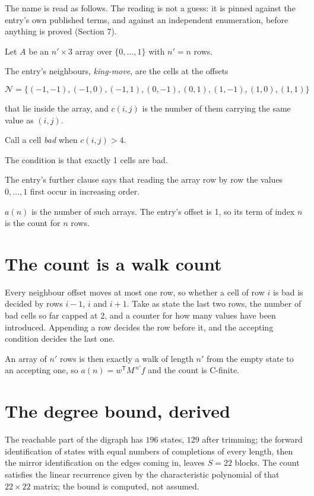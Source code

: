 \documentclass[11pt]{article}
\theoremstyle{definition}
\begin{document}
The name is read as follows. The reading is not a guess: it is pinned against the entry's own published terms, and against an independent enumeration, before anything is proved (Section 7).

Let $A$ be an $n' \times 3$ array over $\{0,\dots,1\}$ with $n' = n$ rows.

The entry's neighbours, {\itshape king-move}, are the cells at the offsets

\[\mathcal{N} = \{(-1,-1), (-1,0), (-1,1), (0,-1), (0,1), (1,-1), (1,0), (1,1)\}\]

that lie inside the array, and $c(i,j)$ is the number of them carrying the same value as $(i,j)$.

Call a cell {\itshape bad} when $c(i,j) > 4$.

The condition is that exactly 1 cells are bad.

The entry's further clause says that reading the array row by row the values $0,\dots,1$ first occur in increasing order.

$a(n)$ is the number of such arrays. The entry's offset is 1, so its term of index $n$ is the count for $n$ rows.

\section{The count is a walk count}

Every neighbour offset moves at most one row, so whether a cell of row $i$ is bad is decided by rows $i-1$, $i$ and $i+1$. Take as state the last two rows, the number of bad cells so far capped at 2, and a counter for how many values have been introduced. Appending a row decides the row before it, and the accepting condition decides the last one.

An array of $n'$ rows is then exactly a walk of length $n'$ from the empty state to an accepting one, so $a(n) = w^{\mathsf T}M^{\,n'}f$ and the count is C-finite.

\section{The degree bound, derived}

The reachable part of the digraph has $196$ states, $129$ after trimming; the forward identification of states with equal numbers of completions of every length, then the mirror identification on the edges coming in, leaves $S = 22$ blocks. The count satisfies the linear recurrence given by the characteristic polynomial of that $22\times22$ matrix; the bound is computed, not assumed.
\end{document}
